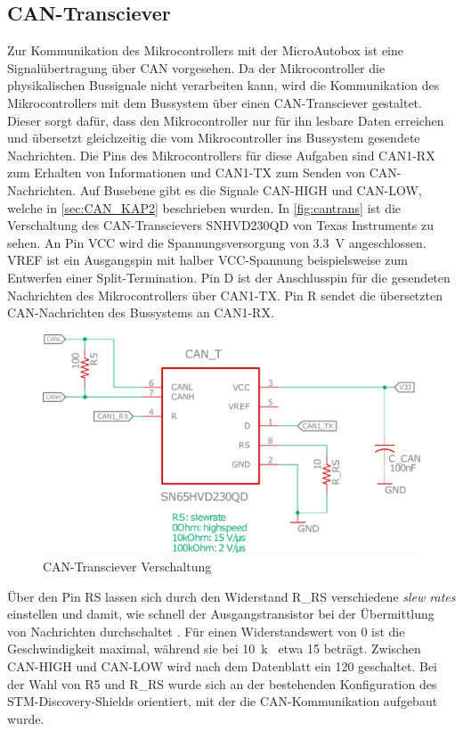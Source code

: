 \subsection{CAN-Transciever}
Zur Kommunikation des Mikrocontrollers mit der MicroAutobox ist eine Signalübertragung über CAN vorgesehen. Da der Mikrocontroller die physikalischen Bussignale nicht verarbeiten kann, wird die Kommunikation des Mikrocontrollers mit dem Bussystem über einen CAN-Transciever gestaltet. Dieser sorgt dafür, dass den Mikrocontroller nur für ihn lesbare Daten erreichen und übersetzt gleichzeitig die vom Mikrocontroller ins Bussystem gesendete Nachrichten. Die Pins des Mikrocontrollers für diese Aufgaben sind CAN1-RX zum Erhalten von Informationen und CAN1-TX zum Senden von CAN-Nachrichten. Auf Busebene gibt es die Signale CAN-HIGH und CAN-LOW, welche in \autoref{sec:CAN_KAP2} beschrieben wurden. In \autoref{fig:cantrans} ist die Verschaltung des CAN-Transcievers SNHVD230QD von Texas Instruments zu sehen. An Pin VCC wird die Spannungsversorgung von \SI{3,3}{V} angeschlossen. VREF ist ein Ausgangspin mit halber VCC-Spannung beispielsweise zum Entwerfen einer Split-Termination. Pin D ist der Anschlusspin für die gesendeten Nachrichten des Mikrocontrollers über CAN1-TX. Pin R sendet die übersetzten CAN-Nachrichten des Bussystems an CAN1-RX.
\begin{figure}[H]%
\centering
\includegraphics[width=400pt]{./Bilder/can.pdf}%
\caption{CAN-Transciever Verschaltung}%
\label{fig:cantrans}%
\end{figure}\noindent
Über den Pin RS lassen sich durch den Widerstand R\_RS verschiedene \textit{slew rates} einstellen und damit, wie schnell der Ausgangstransistor bei der Übermittlung von Nachrichten durchschaltet \cite[S. 2]{cantrans}. Für einen Widerstandswert von \SI{0}{\Omega} ist die Geschwindigkeit maximal, während sie bei \SI{10}{k\Omega} etwa \SI{15}{} beträgt. Zwischen CAN-HIGH und CAN-LOW wird nach dem Datenblatt ein \SI{120}{\Omega} geschaltet. Bei der Wahl von R5 und R\_RS wurde sich an der bestehenden Konfiguration des STM-Discovery-Shields orientiert, mit der die CAN-Kommunikation aufgebaut wurde. 


